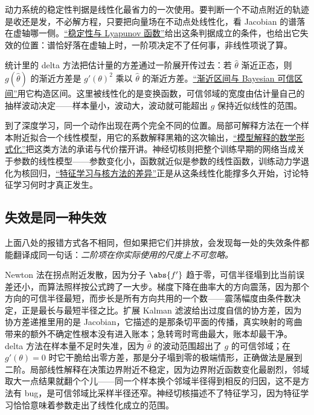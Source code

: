 动力系统的稳定性判据是线性化最省力的一次使用。要判断一个不动点附近的轨迹是收还是发，不必解方程，只要把向量场在不动点处线性化，看 Jacobian 的谱落在虚轴哪一侧。\hyperref[sec:15-Differential-Equations-and-Dynamical-Systems/02-Stability-and-Dynamical-Systems/02]{``稳定性与 Lyapunov 函数''}给出这条判据成立的条件，也给出它失效的位置：谱恰好落在虚轴上时，一阶项决定不了任何事，非线性项说了算。

统计里的 delta 方法把估计量的方差通过一阶展开传过去：若 \(\hat\theta\) 渐近正态，则 \(g(\hat\theta)\) 的渐近方差是 \(g'(\theta)^{2}\) 乘以 \(\hat\theta\) 的渐近方差。\hyperref[sec:11-Mathematical-Statistics/04-Interval-Estimation/03]{``渐近区间与 Bayesian 可信区间''}用它构造区间。这里被线性化的是变换函数，可信邻域的宽度由估计量自己的抽样波动决定——样本量小，波动大，波动就可能超出 \(g\) 保持近似线性的范围。

到了深度学习，同一个动作出现在两个完全不同的位置。局部可解释方法在一个样本附近拟合一个线性模型，用它的系数解释黑箱的这次输出，\hyperref[sec:14-Deep-Learning/10-Interpretability-Mathematics/04]{``模型解释的数学形式化''}把这类方法的承诺与代价摆开讲。神经切核则把整个训练早期的网络当成关于参数的线性模型——参数变化小，函数就近似是参数的线性函数，训练动力学退化为核回归，\hyperref[sec:14-Deep-Learning/10-Interpretability-Mathematics/02]{``特征学习与核方法的差异''}正是从这条线性化能撑多久开始，讨论特征学习何时才真正发生。

\subsection{失效是同一种失效}

上面八处的报错方式各不相同，但如果把它们并排放，会发现每一处的失效条件都能翻译成同一句话：\emph{二阶项在你实际使用的尺度上不可忽略。}

Newton 法在拐点附近发散，因为分子 \(\abs{f'}\) 趋于零，可信半径塌到比当前误差还小，而算法照样按公式跨了一大步。梯度下降在曲率大的方向震荡，因为那个方向的可信半径最短，而步长是所有方向共用的一个数——震荡幅度由条件数决定，正是最长与最短半径之比。扩展 Kalman 滤波给出过度自信的协方差，因为协方差递推里用的是 Jacobian，它描述的是那条切平面的传播，真实映射的弯曲带来的额外不确定性根本没有进入账本；急转弯时弯曲最大，账本却最干净。delta 方法在样本量不足时失准，因为 \(\hat\theta\) 的波动范围超出了 \(g\) 的可信邻域；在 \(g'(\theta)=0\) 时它干脆给出零方差，那是分子塌到零的极端情形，正确做法是展到二阶。局部线性解释在决策边界附近不稳定，因为边界附近函数变化最剧烈，邻域取大一点结果就翻个个儿——同一个样本换个邻域半径得到相反的归因，这不是方法有 bug，是可信邻域比采样半径还窄。神经切核描述不了特征学习，因为特征学习恰恰意味着参数走出了线性化成立的范围。


